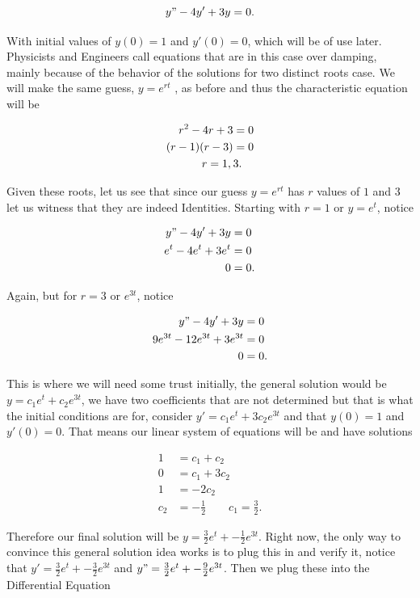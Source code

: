 \documentclass[12pt]{article}
\begin{document}
\begin{equation*}
    y"-4y'+3y=0.
\end{equation*}

With initial values of $y(0)=1$ and $y'(0)=0$, which will be of use later. Physicists and Engineers call equations that are in this case over damping, mainly because of the behavior of the solutions for two distinct roots case. We will make the same guess, $y=e^{rt}$ , as before and thus the characteristic equation will be

\begin{align*}
    r^2-4r+3 &= 0 \\
    (r-1)(r-3) &= 0 \\
    r = 1, \hspace{2 pt}&3.
\end{align*}

Given these roots, let us see that since our guess $y=e^{rt}$ has $r$ values of $1$ and $3$ let us witness that they are indeed Identities. Starting with $r=1$ or $y=e^t$, notice

\begin{align*}
    y"-4y'+3y &= 0 \\
    e^{t}-4e^{t}+3e^{t} &= 0 \\
    0 &= 0.
\end{align*}

Again, but for $r=3$ or $e^{3t}$, notice

\begin{align*}
    y"-4y'+3y &= 0 \\
    9e^{3t}-12e^{3t}+3e^{3t} &= 0 \\
    0 &= 0.
\end{align*}

This is where we will need some trust initially, the general solution would be $y=c_1e^t+c_2e^{3t}$, we have two coefficients that are not determined but that is what the initial conditions are for, consider $y'=c_1e^t+3c_2e^{3t}$ and that $y(0)=1$ and $y'(0)=0$. That means our linear system of equations will be and have solutions

\begin{align*}
    1 &= c_1+c_2 \\
    0 &= c_1+3c_2 \\
    1 &= -2c_2 \\
    c_2 &= -\frac{1}{2} \qquad c_1 = \frac{3}{2}. 
\end{align*}

Therefore our final solution will be $y=\frac{3}{2}e^t+-\frac{1}{2}e^{3t}$. Right now, the only way to convince this general solution idea works is to plug this in and verify it, notice that $y'=\frac{3}{2}e^t+-\frac{3}{2}e^{3t}$ and $y"=\frac{3}{2}e^t+-\frac{9}{2}e^{3t}$. Then we plug these into the Differential Equation
\end{document}
